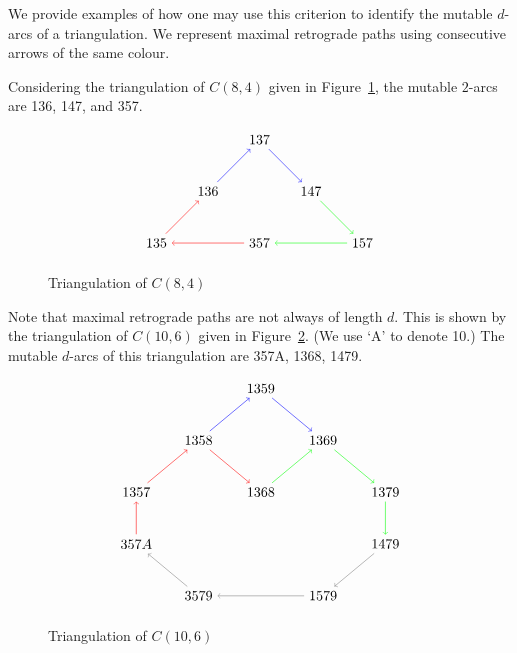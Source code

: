 \documentclass[ALCO,Unicode,published]{cedram}
\begin{document}
\begin{exam}\label{ex:comb_crit}
We provide examples of how one may use this criterion to identify the mutable $d$-arcs of a triangulation. We represent maximal retrograde paths using consecutive arrows of the same colour.

Considering the triangulation of $C(8,4)$ given in Figure~\ref{fig:cyc_triang}, the mutable $2$-arcs are 136, 147, and 357.

\begin{figure}
\caption{Triangulation of $C(8,4)$}\label{fig:cyc_triang}
\[
\begin{tikzpicture}[scale=1.3]

\node(135) at (0,0) {$135$};
\node(136) at (1,1) {$136$};
\node(137) at (2,2) {$137$};
\node(146) at (2,0) {$357$};
\node(147) at (3,1) {$147$};
\node(157) at (4,0) {$157$};

\draw[red,->] (135) -- (136);
\draw[blue,->] (136) -- (137);
\draw[blue,->] (137) -- (147);
\draw[green,->] (147) -- (157);
\draw[red,->] (146) -- (135);
\draw[green,->] (157) -- (146);

\end{tikzpicture}
\]
\end{figure}

Note that maximal retrograde paths are not always of length $d$. This is shown by the triangulation of $C(10,6)$ given in Figure~\ref{fig:one_short_triang}. (We use `A' to denote 10.) The mutable $d$-arcs of this triangulation are 357A, 1368, 1479.

\begin{figure}
\caption{Triangulation of $C(10,6)$}\label{fig:one_short_triang}
\[
\begin{tikzpicture}[scale=1.3,xscale=1.2]

\node(1359) at (0,0) {$1359$};
\node(1358) at (-1,-1) {$1358$};
\node(1369) at (1,-1) {$1369$};
\node(1357) at (-2,-2) {$1357$};
\node(1368) at (0,-2) {$1368$};
\node(1379) at (2,-2) {$1379$};
\node(357A) at (-2,-3) {$357A$};
\node(1479) at (2,-3) {$1479$};
\node(3579) at (-1,-4) {$3579$};
\node(1579) at (1,-4) {$1579$};

\draw[->,blue] (1358) -- (1359);
\draw[->,blue] (1359) -- (1369);
\draw[->,red] (357A) -- (1357);
\draw[->,red] (1357) -- (1358);
\draw[->,red] (1358) -- (1368);
\draw[->,green] (1368) -- (1369);
\draw[->,green] (1369) -- (1379);
\draw[->,green] (1379) -- (1479);
\draw[->,gray] (1479) -- (1579);
\draw[->,gray] (1579) -- (3579);
\draw[->,gray] (3579) -- (357A);

\end{tikzpicture}
\]
\end{figure}


\end{exam}
\end{document}
